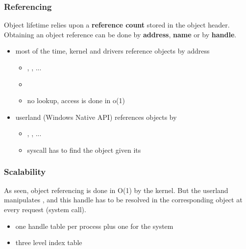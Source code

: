 
\begin{frame}
  \frametitle{Referencing}

  Object lifetime relies upon a \textbf{reference count} stored in the object header.
  Obtaining an object reference can be done by \textbf{address}, \textbf{name} or by
  \textbf{handle}.

  \begin{itemize}
    \item
      most of the time, kernel and drivers reference objects by address

      \begin{itemize}
        \item
          , , ...
        \item
        \item
          no lookup, access is done in o(1)
      \end{itemize}

    \item
      userland (Windows Native API) references objects by 
      \begin{itemize}
        \item
          , ,  ...
        \item
          syscall has to find the object given its 
      \end{itemize}
  \end{itemize}

\end{frame}



\begin{frame}
  \frametitle{Scalability}

  As seen, object referencing is done in O(1) by the kernel. But the
  userland manipulates , and this handle has to be resolved in
  the corresponding object at every request (system call).

  \begin{itemize}
    \item
       one handle table per process plus one for the system
    \item
      three level index table
  \end{itemize}
\end{frame}

